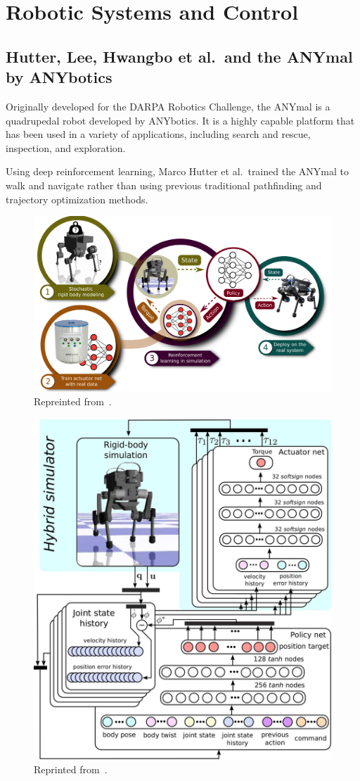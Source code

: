 \documentclass[12pt]{report}
\theoremstyle{definition}
\theoremstyle{remark}
\begin{document}
\chapter{Robotic Systems and Control}

\section{Hutter, Lee, Hwangbo et al.\ and the ANYmal by ANYbotics}
Originally developed for the DARPA Robotics Challenge, the ANYmal is a quadrupedal robot developed by ANYbotics. It is a highly capable platform that has been used in a variety of applications, including search and rescue, inspection, and exploration.

Using deep reinforcement learning, Marco Hutter et al.\ trained the ANYmal to walk and navigate rather than using previous traditional pathfinding and trajectory optimization methods.

\cite{hutter_anymal_2016}

\begin{figure}[h]
    \centering
    \includegraphics[width=\linewidth]{figs/anymal_RL.png}
    \caption{Repreinted from~\cite{hwangbo_learning_2019}.}
    \label{fig:enter-label}
\end{figure}

\begin{figure}[h]
    \centering
    \includegraphics[width=0.5\linewidth]{figs/anymal_detailed.png}
    \caption{Reprinted from~\cite{hwangbo_learning_2019}.}
    \label{fig:enter-label}
\end{figure}
\end{document}
